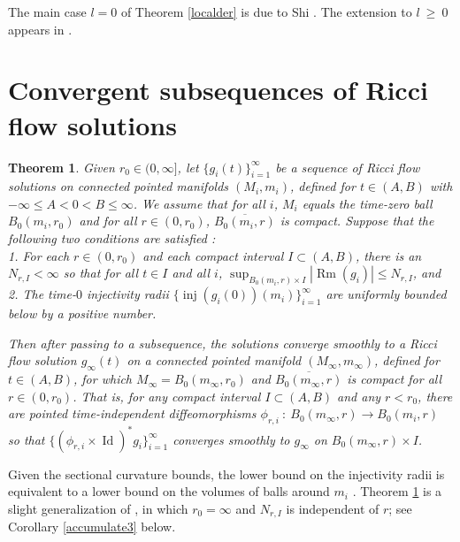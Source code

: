 \documentclass[12pt]{amsart}
\newcommand{\Id}{\operatorname{Id}}
\newcommand{\inj}{\operatorname{inj}}
\newcommand{\Rm}{\operatorname{Rm}}
\numberwithin{equation}{section}
\theoremstyle{plain}
\newtheorem{theorem}[equation]{Theorem}
\theoremstyle{definition}
\theoremstyle{remark}
\begin{document}
The main case $l = 0$ of Theorem \ref{localder} is due to Shi
\cite{Shi2 (1989)}. The extension to $l \: \ge \: 0$ appears in 
\cite[Appendix B]{Lu-Tian}.

\section{Convergent subsequences of Ricci flow solutions} 
\label{subsequence}

\begin{theorem} 
\label{accumulate}
Given $r_0 \in (0, \infty]$, 
let $\{g_i(t)\}_{i=1}^\infty$ be a sequence of Ricci flow solutions
on connected pointed manifolds $(M_i, m_i)$, 
defined for $t \in (A, B)$ with $-\infty \le A < 0 < B \le \infty$.
We assume that for all $i$, $M_i$ equals the time-zero ball $B_0(m_i, r_0)$
and for all $r \in (0, r_0)$, $\overline{B_0(m_i, r)}$ is compact. 
Suppose that the following
two conditions are satisfied : \\
1. For each $r \in (0, r_0)$ and each compact interval $I \subset (A,B)$, 
there is an $N_{r,I} < \infty$ so that for all $t \in I$ and all $i$,
$\sup_{B_0(m_i, r) \times I} |\Rm(g_i)| \le N_{r,I}$, and \\
2. The
time-$0$ injectivity radii 
$\{\inj(g_i(0))(m_i)\}_{i=1}^\infty$ 
are uniformly bounded below by a positive number.

Then after passing to a subsequence, the solutions converge smoothly
to a
Ricci flow solution $g_\infty(t)$ on a connected pointed manifold
$(M_\infty, m_\infty)$, defined for
$t \in (A, B)$, for which $M_\infty = B_0(m_\infty, r_0)$ and
$\overline{B_0(m_\infty, r)}$ is compact for all $r \in (0, r_0)$. 
That is, for any compact interval $I \subset (A, B)$
and any $r < r_0$,
there are pointed
time-independent diffeomorphisms $\phi_{r,i} \: : \: 
B_0(m_\infty, r) \rightarrow B_0(m_i,r)$ so that
$\{(\phi_{r,i} \times \Id)^* g_i\}_{i=1}^\infty$  converges smoothly
to $g_\infty$ on $B_0(m_\infty, r) \times I$. 
\end{theorem}

Given the sectional curvature bounds, the lower
bound on the injectivity radii is equivalent to a lower bound
on the volumes of balls around $m_i$ 
\cite[Theorem 4.7]{Cheeger-Gromov-Taylor}.
Theorem \ref{accumulate} is a slight generalization of
\cite[Main Theorem]{Hamiltonnn}, in which $r_0 = \infty$ and
$N_{r,I}$ is independent of $r$; see Corollary \ref{accumulate3}
below.
\end{document}
